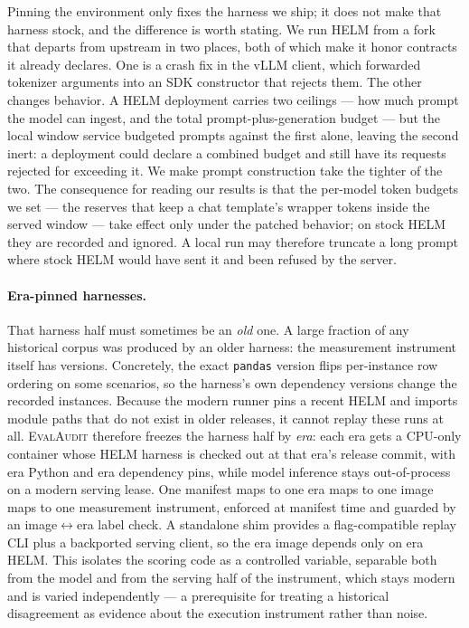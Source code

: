 Pinning the environment only fixes the harness we ship; it does not make that
harness stock, and the difference is worth stating. We run HELM from a fork that
departs from upstream in two places, both of which make it honor contracts it
already declares. One is a crash fix in the vLLM client, which forwarded
tokenizer arguments into an SDK constructor that rejects them. The other changes
behavior. A HELM deployment carries two ceilings --- how much prompt the model can
ingest, and the total prompt-plus-generation budget --- but the local window
service budgeted prompts against the first alone, leaving the second inert: a
deployment could declare a combined budget and still have its requests rejected
for exceeding it. We make prompt construction take the tighter of the two. The
consequence for reading our results is that the per-model token budgets we set
--- the reserves that keep a chat template's wrapper tokens inside the served
window --- take effect only under the patched behavior; on stock HELM they are
recorded and ignored. A local run may therefore truncate a long prompt where
stock HELM would have sent it and been refused by the server.

\paragraph{Era-pinned harnesses.}
\label{sec:eras}
That harness half must sometimes be an \emph{old} one. A large fraction of any
historical corpus was produced by an older harness: the measurement instrument
itself has versions. Concretely, the exact \texttt{pandas} version flips
per-instance row ordering on some scenarios, so the harness's own dependency
versions change the recorded instances. Because the modern runner pins a recent
HELM and imports module paths that do not exist in older releases, it cannot
replay these runs at all. \textsc{EvalAudit} therefore freezes the harness half by
\emph{era}: each era gets a CPU-only container whose HELM harness is checked out
at that era's release commit, with era Python and era dependency pins, while
model inference stays out-of-process on a modern serving lease. One manifest maps
to one era maps to one image maps to one measurement instrument, enforced at
manifest time and guarded by an image$\leftrightarrow$era label check. A
standalone shim provides a flag-compatible replay CLI plus a backported serving
client, so the era image depends only on era HELM. This isolates the scoring code
as a controlled variable, separable both from the model and from the serving half
of the instrument, which stays modern and is varied independently --- a
prerequisite for treating a historical disagreement as evidence about the
execution instrument rather than noise.


